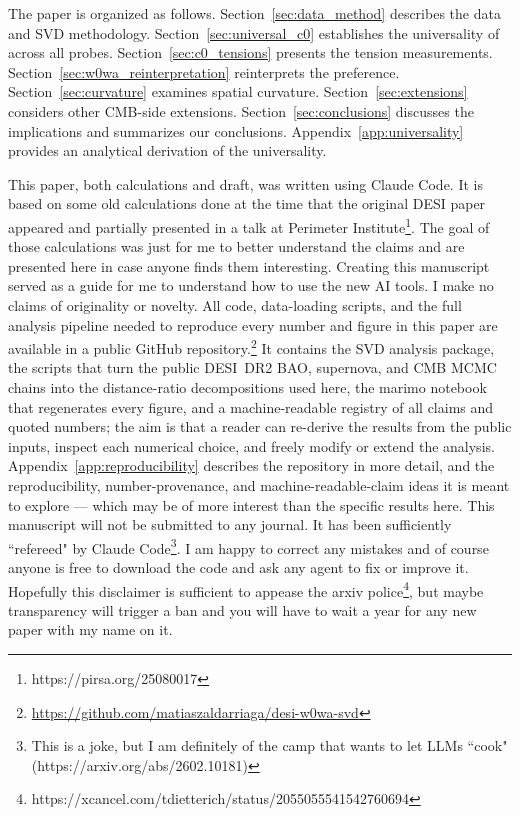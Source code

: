 The paper is organized as follows. Section~\ref{sec:data_method} describes the data and SVD methodology. Section~\ref{sec:universal_c0} establishes the universality of \czero across all probes. Section~\ref{sec:c0_tensions} presents the \czero tension measurements. Section~\ref{sec:w0wa_reinterpretation} reinterprets the \wowa preference. Section~\ref{sec:curvature} examines spatial curvature. Section~\ref{sec:extensions} considers other CMB-side extensions. Section~\ref{sec:conclusions} discusses the implications and summarizes our conclusions. Appendix~\ref{app:universality} provides an analytical derivation of the \czero universality.

This paper, both calculations and draft, was written using Claude Code. It is based on some old calculations done at the time that the original DESI paper appeared and partially presented in a talk at Perimeter Institute\footnote{https://pirsa.org/25080017}. The goal of those calculations was just for me to better understand the claims and are presented here in case anyone finds them interesting. Creating this manuscript served as a guide for me to understand how to use the new AI tools. I make no claims of originality or novelty.  All code, data-loading scripts, and the full analysis pipeline needed to reproduce every number and figure in this paper are available in a public GitHub repository.\footnote{\url{https://github.com/matiaszaldarriaga/desi-w0wa-svd}} It contains the SVD analysis package, the scripts that turn the public DESI~DR2 BAO, supernova, and CMB MCMC chains into the distance-ratio decompositions used here, the marimo notebook that regenerates every figure, and a machine-readable registry of all claims and quoted numbers; the aim is that a reader can re-derive the results from the public inputs, inspect each numerical choice, and freely modify or extend the analysis. Appendix~\ref{app:reproducibility} describes the repository in more detail, and the reproducibility, number-provenance, and machine-readable-claim ideas it is meant to explore --- which may be of more interest than the specific results here. This manuscript will not be submitted to any journal. It has been sufficiently ``refereed" by Claude Code\footnote{This is a joke, but I am definitely of the camp that wants to let LLMs ``cook" (https://arxiv.org/abs/2602.10181)}. I am happy to correct any mistakes and of course anyone is free to download the code and ask any agent to fix or improve it. Hopefully this disclaimer is sufficient to appease the arxiv police\footnote{https://xcancel.com/tdietterich/status/2055055541542760694}, but maybe transparency will trigger a ban and you will have to wait a year for any new paper with my name on it.